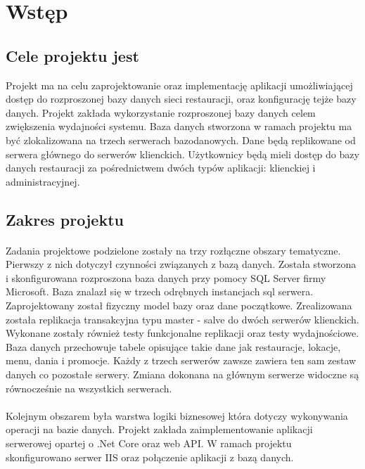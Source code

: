 \documentclass{article}
\begin{document}
\tableofcontents
\newpage
\listoffigures

 \newpage
\section{Wstęp}
	\subsection{Cele projektu jest}
	Projekt ma na celu zaprojektowanie oraz implementację aplikacji umożliwiającej dostęp do rozproszonej bazy danych sieci restauracji, oraz konfigurację tejże bazy danych. Projekt zakłada wykorzystanie rozproszonej bazy danych celem zwiększenia wydajności systemu. Baza danych stworzona w ramach projektu ma być zlokalizowana na trzech serwerach bazodanowych. Dane będą replikowane od serwera głównego do serwerów klienckich. Użytkownicy będą mieli dostęp do bazy danych restauracji za pośrednictwem dwóch typów aplikacji: klienckiej i administracyjnej.
	
	\subsection{Zakres projektu}
	\paragraph{}
	Zadania projektowe podzielone zostały na trzy rozłączne obszary tematyczne. Pierwszy z nich dotyczył czynności związanych z bazą danych. Została stworzona i skonfigurowana rozproszona baza danych przy pomocy SQL Server firmy Microsoft. Baza znalazł się w trzech odrębnych instancjach sql serwera. Zaprojektowany został fizyczny model bazy oraz dane początkowe. Zrealizowana została replikacja transakcyjna typu master - salve do dwóch serwerów klienckich. Wykonane zostały również testy funkcjonalne replikacji oraz testy wydajnościowe. Baza danych przechowuje tabele opisujące takie dane jak restauracje, lokacje, menu, dania i promocje. Każdy z trzech serwerów zawsze zawiera ten sam zestaw danych co pozostałe serwery. Zmiana dokonana na głównym serwerze widoczne są równocześnie na wszystkich serwerach.
	\paragraph{}
	Kolejnym obszarem była warstwa logiki biznesowej która dotyczy wykonywania operacji na bazie danych. Projekt zakłada zaimplementowanie aplikacji serwerowej opartej o .Net Core oraz web API.  W ramach projektu skonfigurowano serwer IIS oraz połączenie aplikacji z bazą danych. 
\end{document}
